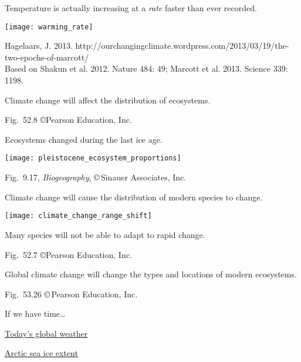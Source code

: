 \documentclass[t]{beamer}
\begin{document}
\begin{frame}[t]{Temperature is actually increasing at a \emph{rate} faster than ever recorded.}
	
	\vspace*{-0.5\baselineskip}
	
	{\centering\texttt{[image: warming\_rate]}\par%
	}
	
	\vfilll
	
	\tiny Hagelaars, J. 2013. http://ourchangingclimate.wordpress.com/2013/03/19/the-two-epochs-of-marcott/\\
Based on Shakun et al. 2012. Nature 484: 49; Marcott et al. 2013. Science 339: 1198. 

\end{frame}
%
{
	\begin{frame}[b]{Climate change will affect the distribution of ecosystems.}
		
		\hfill \tiny Fig.~52.8 \copyright Pearson Education, Inc.
	\end{frame}
}
%
\begin{frame}{Ecosystems changed during the last ice age.}

	\texttt{[image: pleistocene\_ecosystem\_proportions]}

	\vfilll
	
	\hfill \tiny Fig.~9.17, \emph{Biogeography}, \copyright\,Sinauer Associates, Inc.
\end{frame}
%
\begin{frame}[t]{Climate change will cause the distribution of modern species to change.}

	\texttt{[image: climate\_change\_range\_shift]}\par
	
	\hangpara Many species will not be able to adapt to rapid change.
	
	\vfilll
	
	\hfill \tiny Fig.~52.7 \copyright Pearson Education, Inc.

\end{frame}
%
{
\begin{frame}[b]{Global climate change will change the types and locations of modern ecosystems.}

	\hfill \tiny Fig.~53.26 \copyright\,Pearson Education, Inc.
\end{frame}
}
%

\begin{frame}{If we have time\dots}

\href{http://cci-reanalyzer.org/wx/DailySummary/}{Today's global weather}\bigskip

\href{http://nsidc.org/arcticseaicenews/charctic-interactive-sea-ice-graph/}{Arctic sea ice extent}
\end{frame}
\end{document}
